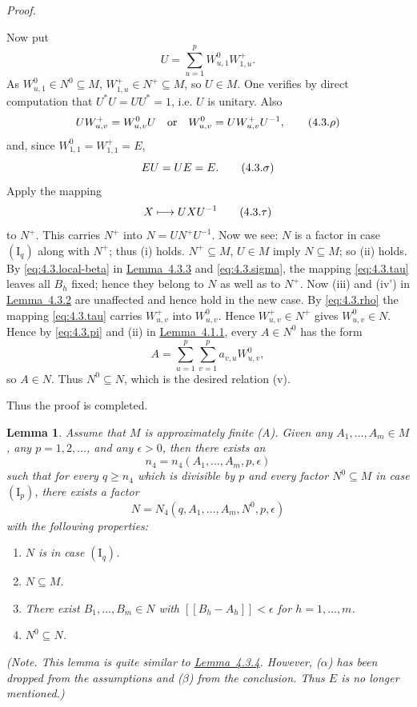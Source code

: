 \documentclass[b5paper,twoside]{article}
\newcommand{\lemref}[2]{\hyperref[#1]{\mbox{Lemma~#2}}}
\theoremstyle{mvnplain}
\newtheorem{lemma}{Lemma}[section]
\renewenvironment{proof}[1][Proof]{%
  \par\addvspace{0.35\baselineskip}%
  \noindent\textit{#1.}\ \normalfont\ignorespaces
}{%
  \par\addvspace{0.35\baselineskip}%
}
\newcommand{\M}{\mathbf M}
\newcommand{\N}{\mathbf N}
\newcommand{\Metric}[1]{\left[\!\left[#1\right]\!\right]}
\def\M{M}%
\def\N{N}%
\def\Metric#1{[[#1]]}%
\begin{document}
\begin{proof}
Now put
\[
  U=\sum_{u=1}^{p}W^0_{u,1}W^+_{1,u}.
\]
As \(W^0_{u,1}\in\N^0\subseteq\M\), \(W^+_{1,u}\in\N^+\subseteq\M\), so
\(U\in\M\). One verifies by direct computation that \(U^*U=UU^*=1\),
i.e. \(U\) is unitary. Also
\begin{equation}\label{eq:4.3.rho}
  UW^+_{u,v}=W^0_{u,v}U
  \quad\text{or}\quad
  W^0_{u,v}=UW^+_{u,v}U^{-1},
  \tag{4.3.\ensuremath{\rho}}
\end{equation}
and, since \(W^0_{1,1}=W^+_{1,1}=E\),
\begin{equation}\label{eq:4.3.sigma}
  EU=UE=E.
  \tag{4.3.\ensuremath{\sigma}}
\end{equation}
Apply the mapping
\begin{equation}\label{eq:4.3.tau}
  X\longmapsto UXU^{-1}
  \tag{4.3.\ensuremath{\tau}}
\end{equation}
to \(\N^+\). This carries \(\N^+\) into \(\N=U\N^+U^{-1}\). Now we
see: \(\N\) is a factor in case \((\mathrm I_q)\) along with \(\N^+\); thus
(i) holds. \(\N^+\subseteq\M\), \(U\in\M\) imply \(\N\subseteq\M\); so
(ii) holds. By \eqref{eq:4.3.local-beta} in
\lemref{lem:4.3.3}{4.3.3} and \eqref{eq:4.3.sigma}, the mapping
\eqref{eq:4.3.tau} leaves all \(B_h\) fixed; hence they belong to \(\N\) as
well as to \(\N^+\). Now (iii) and (iv') in \lemref{lem:4.3.2}{4.3.2} are
unaffected and hence hold in the new case. By \eqref{eq:4.3.rho} the mapping
\eqref{eq:4.3.tau} carries \(W^+_{u,v}\) into \(W^0_{u,v}\). Hence
\(W^+_{u,v}\in\N^+\) gives \(W^0_{u,v}\in\N\). Hence by
\eqref{eq:4.3.pi} and (ii) in \lemref{lem:4.1.1}{4.1.1}, every
\(A\in\N^0\) has the form
\[
  A=\sum_{u=1}^{p}\sum_{v=1}^{p}a_{v,u}W^0_{u,v},
\]
so \(A\in\N\). Thus \(\N^0\subseteq\N\), which is the desired relation
(v).

Thus the proof is completed.
\end{proof}


\begin{lemma}\label{lem:4.3.5}
Assume that \(\M\) is approximately finite (A). Given any
\(A_1,\ldots,A_m\in\M\), any \(p=1,2,\ldots\), and any \(\epsilon>0\),
then there exists an
\[
 n_4=n_4(A_1,\ldots,A_m,p,\epsilon)
\]
such that for every \(q\geq n_4\) which is divisible by \(p\) and every factor
\(\N^0\subseteq\M\) in case \((\mathrm I_p)\), there exists a factor
\[
 \N=\N_4(q,A_1,\ldots,A_m,\N^0,p,\epsilon)
\]
with the following properties:
\begin{enumerate}[label=(\roman*)]
\item \(\N\) is in case \((\mathrm I_q)\).
\item \(\N\subseteq\M\).
\item There exist \(B_1,\ldots,B_m\in\N\) with
      \(\Metric{B_h-A_h}<\epsilon\) for \(h=1,\ldots,m\).
\setcounter{enumi}{4}
\item \(\N^0\subseteq\N\).
\end{enumerate}
(Note. This lemma is quite similar to \lemref{lem:4.3.4}{4.3.4}. However,
(\(\alpha\)) has been dropped from the assumptions and (\(\beta\)) from the
conclusion. Thus \(E\) is no longer mentioned.)
\end{lemma}
\end{document}
